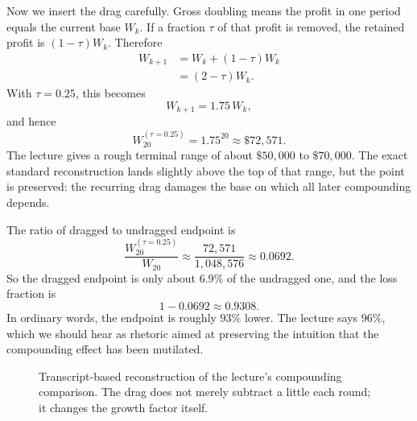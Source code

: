 Now we insert the drag carefully. Gross doubling means the profit in one period equals the current base \(W_k\). If a fraction \(\tau\) of that profit is removed, the retained profit is \((1-\tau)W_k\). Therefore
\begin{align}
W_{k+1}
&=
W_k+(1-\tau)W_k \\
&=
(2-\tau)W_k.
\end{align}
With \(\tau=0.25\), this becomes
\begin{equation}
W_{k+1}=1.75\,W_k,
\end{equation}
and hence
\begin{equation}
W_{20}^{(\tau=0.25)}=1.75^{20}\approx \$72{,}571.
\end{equation}
The lecture gives a rough terminal range of about \(\$50{,}000\) to \(\$70{,}000\). The exact standard reconstruction lands slightly above the top of that range, but the point is preserved: the recurring drag damages the base on which all later compounding depends.

The ratio of dragged to undragged endpoint is
\begin{equation}
\frac{W_{20}^{(\tau=0.25)}}{W_{20}}
\approx
\frac{72{,}571}{1{,}048{,}576}
\approx
0.0692.
\end{equation}
So the dragged endpoint is only about \(6.9\%\) of the undragged one, and the loss fraction is
\begin{equation}
1-0.0692\approx 0.9308.
\end{equation}
In ordinary words, the endpoint is roughly \(93\%\) lower. The lecture says \(96\%\), which we should hear as rhetoric aimed at preserving the intuition that the compounding effect has been mutilated.

\begin{figure}[h]
\centering
{}
\caption{Transcript-based reconstruction of the lecture's compounding comparison. The drag does not merely subtract a little each round; it changes the growth factor itself.}
\end{figure}

